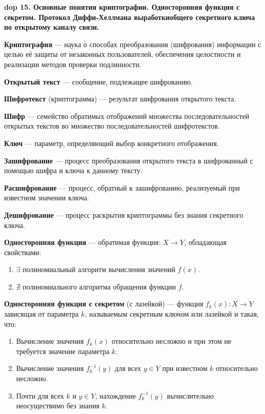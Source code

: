 \textbf{\LARGE dop 15. Основные  понятия  криптографии.  Односторонняя  функция  с  секретом.  Протокол  Диффи-Хеллмана выработкиобщего секретного ключа по открытому каналу связи.}

\textbf{Криптография} --- наука о способах преобразования (шифрования) информации с целью её защиты от незаконных пользователей, обеспечения целостности и реализации методов проверки подлинности.

\textbf{Открытый текст} --- сообщение, подлежащее шифрованию.

\textbf{Шифротекст} (криптограмма) --- результат шифрования открытого текста.

\textbf{Шифр} --- семейство обратимых отображений множества последовательностей открытых текстов во множество последовательностей шифротекстов.

\textbf{Ключ} --- параметр, определяющий выбор конкретного отображения.

\textbf{Зашифрование} --- процесс преобразования открытого текста в шифрованный с помощью шифра и ключа к данному тексту.

\textbf{Расшифрование} --- процесс, обратный к зашифрованию, реализуемый при известном значении ключа.

\textbf{Дешифрование} --- процесс раскрытия криптограммы без знания секретного ключа.

\textbf{Односторонняя функция} --- обратимая функция: $X \rightarrow Y$, обладающая свойствами:
\begin{enumerate}
    \item $\exists$ полиномиальный алгоритм вычисления значений $f(x)$.
    \item $\nexists$ полиномиального алгоритма обращения функции $f$.
\end{enumerate}

\textbf{Односторонняя функция с секретом} (с лазейкой) — функция $f_k(x): X \rightarrow Y$ зависящая от параметра $k$, называемым секретным ключом или лазейкой и такая, что:
\begin{enumerate}
    \item Вычисление значения $f_k(x)$ относительно несложно и при этом не требуется значение параметра $k$.
    \item Вычисление значения $f^{-1}_k(y)$ для всех $y \in Y$ при известном $k$ относительно несложно.
    \item Почти для всех $k$ и $y \in Y$, нахождение $f^{-1}_k(y)$ вычислительно неосуществимо без знания $k$.
\end{enumerate}

